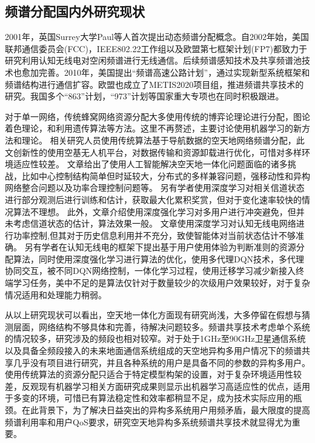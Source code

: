 \subsection{频谱分配国内外研究现状}

2001年，英国Surrey大学Paul等人首次提出动态频谱分配概念。自2002年始，美国联邦通信委员会(FCC)，IEEE802.22工作组以及欧盟第七框架计划(FP7)都致力于研究利用认知无线电对空闲频谱进行无线通信。后续频谱感知技术及共享频谱池技术也愈加完善。2010年，美国提出“频谱高速公路计划”，通过实现新型系统框架和频谱结构进行通信扩容。欧盟也成立了METIS2020项目组，推进频谱共享技术的研究。我国多个“863”计划，“973”计划等国家重大专项也在同时积极跟进。

对于单一网络，传统蜂窝网络资源分配\cite{廖晓闽2019基于深度强化学习的蜂窝网资源分配算法}大多使用传统的博弈论理论\cite{6998030}进行分配，图论着色理论\cite{7833211}，和利用遗传算法\cite{8336853}等方法。这里不再赘述，主要讨论使用机器学习的新方法和理论。
相关研究人员\cite{7127619}使用传统算法基于导航数据的空天地网络频谱分配，此文创新性的使用空基无人机平台，对数据传输和资源卸载进行优化，可惜对多样环境适应性较差。
文章\cite{8612450}给出了使用人工智能解决空天地一体化问题面临的诸多挑战，比如中心控制结构简单但时延较大，分布式的多样兼容问题，强移动性和异构网络整合问题以及功率合理控制问题等。
另有学者使用深度学习对相关信道状态进行部分观测后进行训练和估计\cite{8303773}，获取最大化累积奖赏，但对于变化速率较快的情况算法不理想。
此外，文章\cite{8254101}介绍使用深度强化学习对多用户进行冲突避免，但并未考虑信道状态的估计，算法效果一般。
文章\cite{Li2018Intelligent}使用深度学习对认知无线电网络进行功率控制,但其对于历史信息利用并不充分，致使智能体对当前状态估计不够准确。
另有学者\cite{8403658}在认知无线电的框架下提出基于用户使用体验为判断准则的资源分配算法，同时使用深度强化学习进行算法的优化，使用多代理DQN技术，多代理协同交互，被不同DQN网络控制，一体化学习过程，使用迁移学习减少新接入终端学习任务，美中不足的是算法仅针对于数量较少的次级用户效果较好，对于复杂情况适用和处理能力稍弱。

从以上研究现状可以看出，空天地一体化方面现有研究尚浅，大多停留在假想与猜测层面，网络结构不够具体和完善，待解决问题较多。频谱共享技术考虑单个系统的情况较多，研究涉及的频段也相对较窄。对于处于1GHz至90GHz卫星通信系统以及具备全频段接入的未来地面通信系统组成的天空地异构多用户情况下的频谱共享几乎没有项目进行研究，并且各种系统的用户是具备不同的参数的异构多用户。使用传统算法的资源分配只适合于特定模型构架的设置，对于复杂环境适用性较差，反观现有机器学习相关方面研究成果则显示出机器学习高适应性的优点，适用于多变的环境，可惜已有算法稳定性和效率都稍显不足，成为技术实际应用的瓶颈。在此背景下，为了解决日益突出的异构多系统用户用频矛盾，最大限度的提高频谱利用率和用户QoS要求，研究空天地异构多系统频谱共享技术就显得尤为重要。

